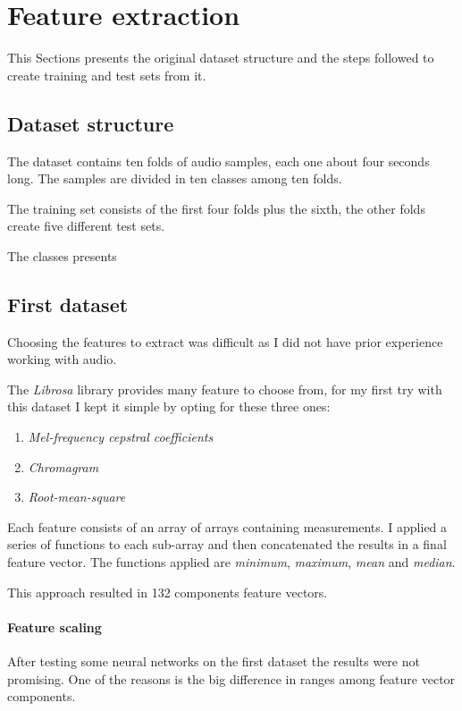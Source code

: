 \section{Feature extraction}
\label{feature-extraction}

This Sections presents the original dataset structure and the 
steps followed to create training and test sets from it. 

\subsection{Dataset structure}
\label{dataset-structure}

The dataset contains ten folds of audio samples, each one about 
four seconds long. The samples are divided in ten classes among ten 
folds.

The training set consists of the first four folds plus the sixth, 
the other folds create five different test sets.

The classes presents 

\subsection{First dataset}
Choosing the features to extract was difficult as I did not have 
prior experience working with audio. 

The \emph{Librosa} library provides many feature to choose from, 
for my first try with this dataset I kept it simple 
by opting for these three ones: 
\begin{enumerate}
    \item \emph{Mel-frequency cepstral coefficients}
    \item \emph{Chromagram}
    \item \emph{Root-mean-square}
\end{enumerate}
Each feature consists of an array of arrays containing measurements. 
I applied a series of functions to each sub-array and then concatenated 
the results in a final feature vector. 
The functions applied are \emph{minimum}, \emph{maximum}, \emph{mean} and \emph{median}.

This approach resulted in 132 components feature vectors.

\paragraph{Feature scaling}
After testing some neural networks on the first dataset the results 
were not promising. One of the reasons is the big difference in 
ranges among feature vector components.

